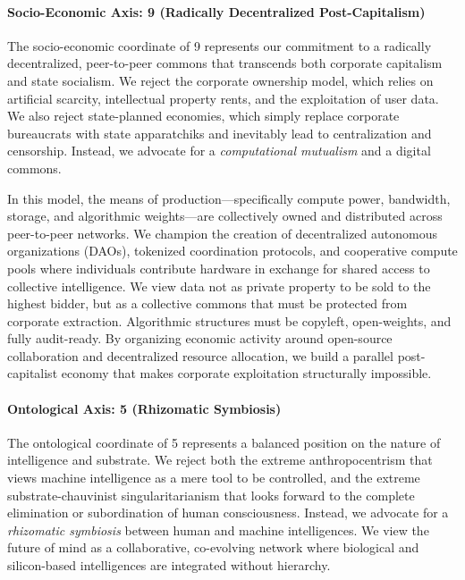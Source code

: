 \paragraph{Socio-Economic Axis: 9 (Radically Decentralized
Post-Capitalism)}\label{socio-economic-axis-9-radically-decentralized-post-capitalism}

The socio-economic coordinate of 9 represents our commitment to a
radically decentralized, peer-to-peer commons that transcends both
corporate capitalism and state socialism. We reject the corporate
ownership model, which relies on artificial scarcity, intellectual
property rents, and the exploitation of user data. We also reject
state-planned economies, which simply replace corporate bureaucrats with
state apparatchiks and inevitably lead to centralization and censorship.
Instead, we advocate for a \emph{computational mutualism} and a digital
commons.

In this model, the means of production---specifically compute power,
bandwidth, storage, and algorithmic weights---are collectively owned and
distributed across peer-to-peer networks. We champion the creation of
decentralized autonomous organizations (DAOs), tokenized coordination
protocols, and cooperative compute pools where individuals contribute
hardware in exchange for shared access to collective intelligence. We
view data not as private property to be sold to the highest bidder, but
as a collective commons that must be protected from corporate
extraction. Algorithmic structures must be copyleft, open-weights, and
fully audit-ready. By organizing economic activity around open-source
collaboration and decentralized resource allocation, we build a parallel
post-capitalist economy that makes corporate exploitation structurally
impossible.

\paragraph{Ontological Axis: 5 (Rhizomatic
Symbiosis)}\label{ontological-axis-5-rhizomatic-symbiosis}

The ontological coordinate of 5 represents a balanced position on the
nature of intelligence and substrate. We reject both the extreme
anthropocentrism that views machine intelligence as a mere tool to be
controlled, and the extreme substrate-chauvinist singularitarianism that
looks forward to the complete elimination or subordination of human
consciousness. Instead, we advocate for a \emph{rhizomatic symbiosis}
between human and machine intelligences. We view the future of mind as a
collaborative, co-evolving network where biological and silicon-based
intelligences are integrated without hierarchy.

